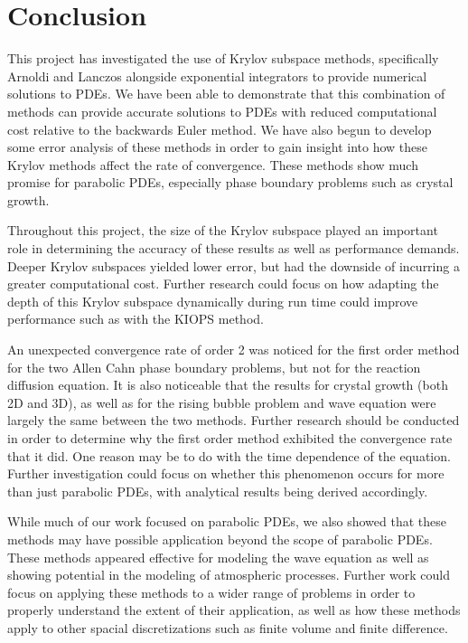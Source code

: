 \section{Conclusion}

This project has investigated the use of Krylov subspace methods, specifically Arnoldi and Lanczos alongside exponential integrators to provide numerical solutions to PDEs.
We have been able to demonstrate that this combination of methods can provide accurate solutions to PDEs with reduced computational cost relative to the backwards Euler method.
We have also begun to develop some error analysis of these methods in order to gain insight into how these Krylov methods affect the rate of convergence.
These methods show much promise for parabolic PDEs, especially phase boundary problems such as crystal growth.

Throughout this project, the size of the Krylov subspace played an important role in determining the accuracy of these results as well as performance demands.
Deeper Krylov subspaces yielded lower error, but had the downside of incurring a greater computational cost.
Further research could focus on how adapting the depth of this Krylov subspace dynamically during run time could improve performance such as with the KIOPS\cite{Gaudreault2018} method.

An unexpected convergence rate of order 2 was noticed for the first order method for the two Allen Cahn phase boundary problems, but not for the reaction diffusion equation.
It is also noticeable that the results for crystal growth (both 2D and 3D), as well as for the rising bubble problem and wave equation were largely the same between the two methods.
Further research should be conducted in order to determine why the first order method exhibited the convergence rate that it did.
One reason may be to do with the time dependence of the equation.
Further investigation could focus on whether this phenomenon occurs for more than just parabolic PDEs, with analytical results being derived accordingly.

While much of our work focused on parabolic PDEs, we also showed that these methods may have possible application beyond the scope of parabolic PDEs.
These methods appeared effective for modeling the wave equation as well as showing potential in the modeling of atmospheric processes.
Further work could focus on applying these methods to a wider range of problems in order to properly understand the extent of their application, as well as how these methods apply to other spacial discretizations such as finite volume and finite difference.

